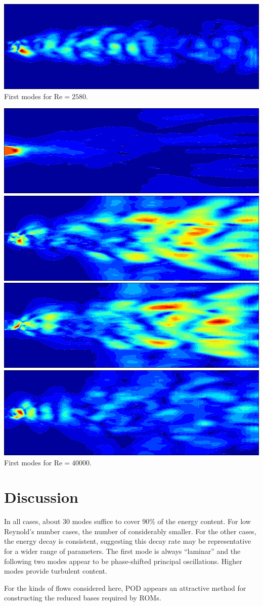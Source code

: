 \documentclass[a0,portrait]{a0poster}
\begin{document}
\begin{multicols}{2}
\begin{center}
  \includegraphics[width=0.48\linewidth]{figs/Re2580-04}
  First modes for $\text{Re} = 2580$.
\end{center}
\begin{center}
  \includegraphics[width=0.48\linewidth]{figs/Re40000-01} \hspace{0.1cm}
  \includegraphics[width=0.48\linewidth]{figs/Re40000-02} \\[0.3cm]
  \includegraphics[width=0.48\linewidth]{figs/Re40000-03} \hspace{0.1cm}
  \includegraphics[width=0.48\linewidth]{figs/Re40000-04}
  First modes for $\text{Re} = 40000$.
\end{center}

\section*{\LARGE Discussion}

In all cases, about 30 modes suffice to cover $90\%$ of the energy content. For
low Reynold's number cases, the number of considerably smaller. For the other
cases, the energy decay is consistent, suggesting this decay rate may be
representative for a wider range of parameters. The first mode is always
``laminar'' and the following two modes appear to be phase-shifted principal
oscillations. Higher modes provide turbulent content.

For the kinds of flows considered here, POD appears an attractive method for
constructing the reduced bases required by ROMs.

\end{multicols}
\end{document}
